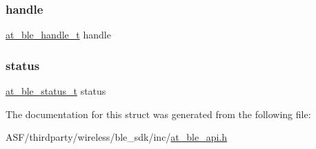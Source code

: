 \mbox{\label{structat__ble__encryption__status__changed__t_ab8b0f353cb6a8d85f0822900e3b7cf35}} 
\subsubsection{\texorpdfstring{handle}{handle}}
{\footnotesize\ttfamily \mbox{\hyperlink{at__ble__api_8h_abd23646d0c662860741f787efc8456f2}{at\+\_\+ble\+\_\+handle\+\_\+t}} handle}

\mbox{\label{structat__ble__encryption__status__changed__t_a0b48093fc2030779fc47e5216f8019e2}} 
\subsubsection{\texorpdfstring{status}{status}}
{\footnotesize\ttfamily \mbox{\hyperlink{group__error__codes__group_ga3b1db9b95feb157b3c188ca27fe76988}{at\+\_\+ble\+\_\+status\+\_\+t}} status}



The documentation for this struct was generated from the following file\+:\begin{DoxyCompactItemize}
\item 
A\+S\+F/thirdparty/wireless/ble\+\_\+sdk/inc/\mbox{\hyperlink{at__ble__api_8h}{at\+\_\+ble\+\_\+api.\+h}}\end{DoxyCompactItemize}
